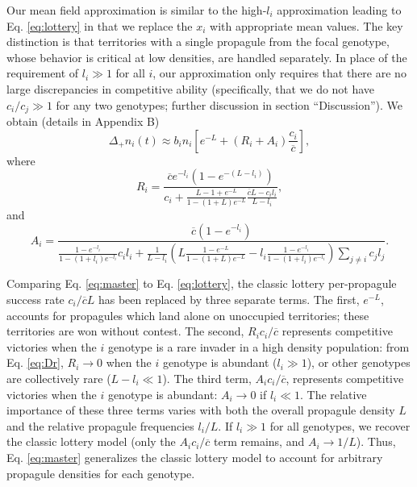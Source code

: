 \documentclass[11pt]{article}
\begin{document}
Our mean field approximation is similar to the high-$l_i$ approximation leading to Eq. \eqref{eq:lottery} in that we replace the $x_i$ with appropriate mean values. The key distinction is that territories with a single propagule from the focal genotype, whose behavior is critical at low densities, are handled separately. In place of the requirement of $l_i\gg 1$ for all $i$, our approximation only requires that there are no large discrepancies in competitive ability (specifically, that we do not have $c_i/c_j\gg 1$ for any two genotypes; further discussion in section ``Discussion''). We obtain (details in Appendix B)
\begin{equation}
\Delta_+ n_i(t)\approx b_i n_i\left[e^{-L}+(R_i+A_i)\frac{c_i}{\overline{c}}\right], \label{eq:master}
\end{equation}
where
\begin{equation}
R_i=\frac{\overline{c}e^{-l_i}(1-e^{-(L-l_i)})}{c_i +\frac{L-1+e^{-L}}{1-(1+L)e^{-L}}\frac{\overline{c}L- c_il_i}{L-l_i}},\label{eq:Dr}
\end{equation}
and
\begin{equation}
A_i=\frac{\overline{c}(1-e^{-l_i})}{\frac{1-e^{-l_i}}{1-(1+l_i)e^{-l_i}}c_il_i+\frac{1}{L-l_i}\left(L\frac{1-e^{-L}}{1-(1+L)e^{-L}}-l_i\frac{1-e^{-l_i}}{1-(1+l_i)e^{-l_i}}\right)\sum_{j\neq i}c_jl_j}.\label{eq:Da}
\end{equation}

Comparing Eq. \eqref{eq:master} to Eq. \eqref{eq:lottery}, the classic lottery per-propagule success rate $c_i/\overline{c}L$ has been replaced by three separate terms. The first, $e^{-L}$, accounts for propagules which land alone on unoccupied territories; these territories are won without contest. The second, $R_i c_i/\overline{c}$ represents competitive victories when the $i$ genotype is a rare invader in a high density population: from Eq. \eqref{eq:Dr}, $R_i\rightarrow 0$ when the $i$ genotype is abundant ($l_i\gg 1$), or other genotypes are collectively rare ($L-l_i\ll 1$). The third term, $A_ic_i/\overline{c}$, represents competitive victories when the $i$ genotype is abundant: $A_i\rightarrow 0$ if $l_i\ll 1$. The relative importance of these three terms varies with both the overall propagule density $L$ and the relative propagule frequencies $l_i/L$. If $l_i\gg 1$ for all genotypes, we recover the classic lottery model (only the $A_ic_i/\overline{c}$ term remains, and $A_i\rightarrow 1/L$). Thus, Eq. \eqref{eq:master} generalizes the classic lottery model to account for arbitrary propagule densities for each genotype. 
\end{document}

